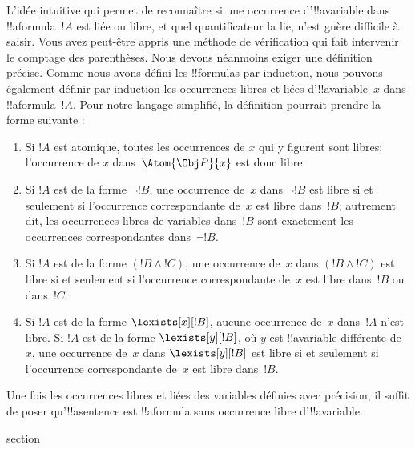 \documentclass[11pt,a4paper,openany]{memoir}
\begin{document}
L'idée intuitive qui permet de reconnaître si une occurrence
d'!!a{variable} dans !!a{formula}~$!A$ est liée ou libre, et quel
quantificateur la lie, n'est guère difficile à saisir. Vous avez
peut-être appris une méthode de vérification qui fait intervenir le
comptage des parenthèses. Nous devons néanmoins exiger une définition
précise. Comme nous avons défini les !!{formula}s par induction, nous
pouvons également définir par induction les occurrences libres et
liées d'!!a{variable}~$x$ dans !!a{formula}~$!A$. Pour notre langage
simplifié, la définition pourrait prendre la forme suivante :
\begin{enumerate}
  \item Si $!A$ est atomique, toutes les occurrences de $x$ qui y
  figurent sont libres; l'occurrence de $x$ dans~$\Atom{\Obj P}{x}$ est
  donc libre.
  \item Si $!A$ est de la forme $\lnot !B$, une occurrence de~$x$ dans
  $\lnot !B$ est libre si et seulement si l'occurrence correspondante
  de~$x$ est libre dans~$!B$; autrement dit, les occurrences libres de
  variables dans~$!B$ sont exactement les occurrences correspondantes
  dans~$\lnot !B$.
  \item Si $!A$ est de la forme $(!B \land !C)$, une occurrence de~$x$
  dans $(!B \land !C)$ est libre si et seulement si l'occurrence
  correspondante de~$x$ est libre dans~$!B$ ou dans~$!C$.
  \item Si $!A$ est de la forme $\lexists[x][!B]$, aucune occurrence
  de~$x$ dans~$!A$ n'est libre. Si $!A$ est de la forme
  $\lexists[y][!B]$, où $y$ est !!a{variable} différente de~$x$, une
  occurrence de~$x$ dans $\lexists[y][!B]$ est libre si et seulement
  si l'occurrence correspondante de~$x$ est libre dans~$!B$.
\end{enumerate}

Une fois les occurrences libres et liées des variables définies avec
précision, il suffit de poser qu'!!a{sentence} est !!a{formula} sans
occurrence libre d'!!a{variable}.


\endgroup



\begingroup
\expandafter\def\csname ol@sectioncs\endcsname{section}
\def\olfilename{semantic-notions}



\end{document}
